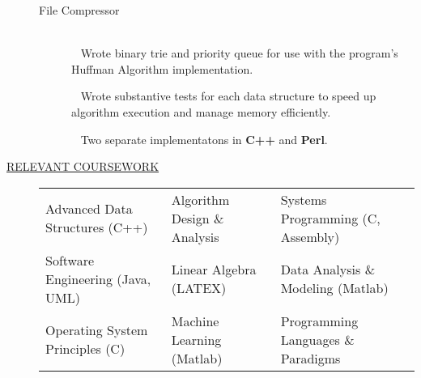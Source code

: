 \documentclass[12pt]{article}
\begin{document}
\begin{description}
\begin{description}
            \item[File Compressor] \hfill \\
                \textbullet ~ Wrote binary trie and priority queue for use with the program's Huffman Algorithm implementation.

                \textbullet ~ Wrote substantive tests for each data
                    structure to speed up algorithm execution and manage memory efficiently.

                \textbullet ~ Two separate implementatons in {\bf C++} and {\bf Perl}.

            \end{description}

        \item[\underline{RELEVANT COURSEWORK}]\hfill

            \begin{tabular}{l|l|l}
                Advanced Data Structures (C++)& Algorithm Design \& Analysis & Systems Programming (C, Assembly)\\
             Software Engineering (Java, UML) & Linear Algebra (LATEX) &  Data Analysis \& Modeling (Matlab) \\
                  Operating System Principles (C) & Machine Learning (Matlab) & Programming Languages \& Paradigms\\
            \end{tabular}


\end{description}
\end{document}
